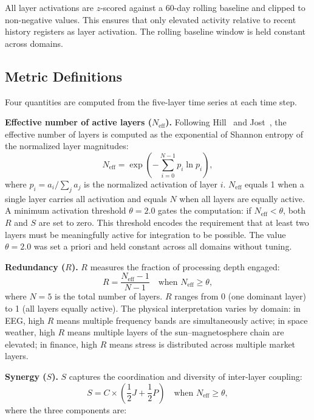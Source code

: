 \documentclass[aip,cha,reprint,amsmath,amssymb]{revtex4-2}
\begin{document}
All layer activations are $z$-scored against a 60-day rolling baseline and clipped to non-negative values. This ensures that only elevated activity relative to recent history registers as layer activation. The rolling baseline window is held constant across domains.

\subsection{Metric Definitions}

Four quantities are computed from the five-layer time series at each time step.

\textbf{Effective number of active layers ($N_\text{eff}$).} Following Hill~\cite{hill1973} and Jost~\cite{jost2006}, the effective number of layers is computed as the exponential of Shannon entropy of the normalized layer magnitudes:
\begin{equation}
N_{\text{eff}} = \exp\left( -\sum_{i=0}^{N-1} p_i \ln p_i \right),
\end{equation}
where $p_i = a_i / \sum_j a_j$ is the normalized activation of layer $i$. $N_\text{eff}$ equals 1 when a single layer carries all activation and equals $N$ when all layers are equally active. A minimum activation threshold $\theta = 2.0$ gates the computation: if $N_\text{eff} < \theta$, both $R$ and $S$ are set to zero. This threshold encodes the requirement that at least two layers must be meaningfully active for integration to be possible. The value $\theta = 2.0$ was set a priori and held constant across all domains without tuning.

\textbf{Redundancy ($R$).} $R$ measures the fraction of processing depth engaged:
\begin{equation}
R = \frac{N_{\text{eff}} - 1}{N - 1} \quad \text{when } N_{\text{eff}} \geq \theta,
\end{equation}
where $N = 5$ is the total number of layers. $R$ ranges from 0 (one dominant layer) to 1 (all layers equally active). The physical interpretation varies by domain: in EEG, high $R$ means multiple frequency bands are simultaneously active; in space weather, high $R$ means multiple layers of the sun--magnetosphere chain are elevated; in finance, high $R$ means stress is distributed across multiple market layers.

\textbf{Synergy ($S$).} $S$ captures the coordination and diversity of inter-layer coupling:
\begin{equation}
S = C \times \left(\frac{1}{2} J + \frac{1}{2} P\right) \quad \text{when } N_{\text{eff}} \geq \theta,
\end{equation}
where the three components are:
\end{document}
